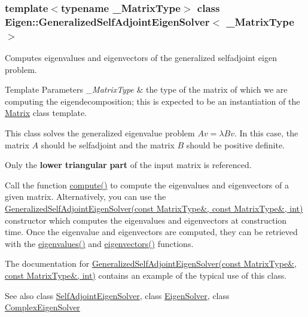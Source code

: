 \subsubsection*{template$<$typename \+\_\+\+Matrix\+Type$>$\newline
class Eigen\+::\+Generalized\+Self\+Adjoint\+Eigen\+Solver$<$ \+\_\+\+Matrix\+Type $>$}

Computes eigenvalues and eigenvectors of the generalized selfadjoint eigen problem. 


\begin{DoxyTemplParams}{Template Parameters}
{\em \+\_\+\+Matrix\+Type} & the type of the matrix of which we are computing the eigendecomposition; this is expected to be an instantiation of the \hyperlink{group___core___module_class_eigen_1_1_matrix}{Matrix} class template.\\
\hline
\end{DoxyTemplParams}
This class solves the generalized eigenvalue problem $ Av = \lambda Bv $. In this case, the matrix $ A $ should be selfadjoint and the matrix $ B $ should be positive definite.

Only the {\bfseries lower} {\bfseries triangular} {\bfseries part} of the input matrix is referenced.

Call the function \hyperlink{group___eigenvalues___module_a724764fe196612b752042692156ed023}{compute()} to compute the eigenvalues and eigenvectors of a given matrix. Alternatively, you can use the \hyperlink{group___eigenvalues___module_addc0409c9cb1a5ac9cbbd00efe68908e}{Generalized\+Self\+Adjoint\+Eigen\+Solver(const Matrix\+Type\&, const Matrix\+Type\&, int)} constructor which computes the eigenvalues and eigenvectors at construction time. Once the eigenvalue and eigenvectors are computed, they can be retrieved with the \hyperlink{group___eigenvalues___module_a8efab27e82aa6aa0ae0c64739238c2e0}{eigenvalues()} and \hyperlink{group___eigenvalues___module_a7b9f7e641fa46ac4c5f2371405c69b2b}{eigenvectors()} functions.

The documentation for \hyperlink{group___eigenvalues___module_addc0409c9cb1a5ac9cbbd00efe68908e}{Generalized\+Self\+Adjoint\+Eigen\+Solver(const Matrix\+Type\&, const Matrix\+Type\&, int)} contains an example of the typical use of this class.

\begin{DoxySeeAlso}{See also}
class \hyperlink{group___eigenvalues___module_class_eigen_1_1_self_adjoint_eigen_solver}{Self\+Adjoint\+Eigen\+Solver}, class \hyperlink{group___eigenvalues___module_class_eigen_1_1_eigen_solver}{Eigen\+Solver}, class \hyperlink{group___eigenvalues___module_class_eigen_1_1_complex_eigen_solver}{Complex\+Eigen\+Solver} 
\end{DoxySeeAlso}


